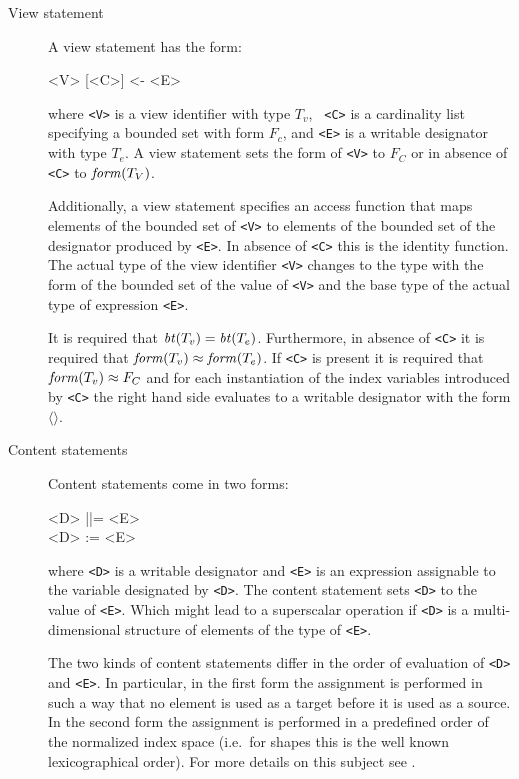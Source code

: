 \begin{description}

\item[View statement]

A view statement has the form:

\begin{frag}
<V> [<C>] <- <E>
\end{frag}

\noindent where {\tt <V>} is a view identifier with type $T_v$, {\tt
<C>} is a cardinality list specifying a bounded set with form $F_c$,
and {\tt <E>} is a writable designator with type $T_e$. A view
statement sets the form of {\tt <V>} to $F_C$ or in absence of {\tt
<C>} to $\mbox{\em form\/}(T_V)$.

Additionally, a view statement specifies an access function that maps
elements of the bounded set of {\tt <V>} to elements of the bounded
set of the designator produced by {\tt <E>}. In absence of {\tt <C>}
this is the identity function. The actual type of the view identifier
{\tt <V>} changes to the type with the form of the bounded set of the
value of {\tt <V>} and the base type of the actual type of expression
{\tt <E>}.

It is required that $\mbox{\em bt\/}(T_v) = \mbox{\em bt\/}(T_e)$. Furthermore, in absence of
{\tt <C>} it is required that $\mbox{\em form\/}(T_v) \approx \mbox{\em form\/}(T_e)$.  If
{\tt <C>} is present it is required that $\mbox{\em form\/}(T_v) \approx F_C$ and
for each instantiation of the index variables introduced by {\tt <C>}
the right hand side evaluates to a writable designator with the form
$\langle \rangle$.


\item[Content statements] Content statements come in two forms:

\begin{frag}
<D> ||= <E>\\
\hlf
<D> := <E>
\end{frag}

where {\tt <D>} is a writable designator and {\tt <E>} is an
expression assignable to the variable designated by {\tt <D>}. The
content statement sets {\tt <D>} to the value of {\tt <E>}. Which
might lead to a superscalar operation if {\tt <D>} is a
multi-dimensional structure of elements of the type of {\tt <E>}.

The two kinds of content statements differ in the order of evaluation
of {\tt <D>} and {\tt <E>}. In particular, in the first form the
assignment is performed in such a way that no element is used as a
target before it is used as a source. In the second form the
assignment is performed in a predefined order of the normalized index
space (i.e.\ for shapes this is the well known lexicographical
order). For more details on this subject see \cite{Dechering95a}.


\end{description}
